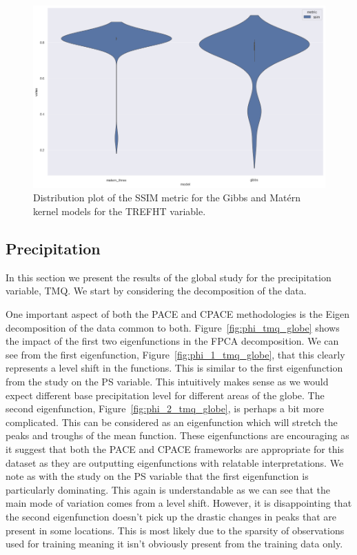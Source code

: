 \begin{figure}
	\centering
	\includegraphics[width=\textwidth]{cesm_trefht_dist}
	\caption{Distribution plot of the SSIM metric for the Gibbs and Mat\'ern kernel models for the TREFHT variable.}
	\label{fig:cesm_trefht_dist}
\end{figure}

\subsection{Precipitation \label{ssec:cesm_tmq}}
In this section we present the results of the global study for the precipitation variable, TMQ.
We start by considering the decomposition of the data. 

One important aspect of both the PACE and CPACE methodologies is the Eigen decomposition of the data common to both. 
Figure~\ref{fig:phi_tmq_globe} shows the impact of the first two eigenfunctions in the FPCA decomposition.
We can see from the first eigenfunction, Figure~\ref{fig:phi_1_tmq_globe}, that this clearly represents a level shift in the functions.
This is similar to the first eigenfunction from the study on the PS variable.
This intuitively makes sense as we would expect different base precipitation level for different areas of the globe.
The second eigenfunction, Figure~\ref{fig:phi_2_tmq_globe}, is perhaps a bit more complicated.
This can be considered as an eigenfunction which will stretch the peaks and troughs of the mean function.
These eigenfunctions are encouraging as it suggest that both the PACE and CPACE frameworks are appropriate for this dataset as they are outputting eigenfunctions with relatable interpretations.
We note as with the study on the PS variable that the first eigenfunction is particularly dominating.
This again is understandable as we can see that the main mode of variation comes from a level shift.
However, it is disappointing that the second eigenfunction doesn't pick up the drastic changes in peaks that are present in some locations. 
This is most likely due to the sparsity of observations used for training meaning it isn't obviously present from the training data only.

